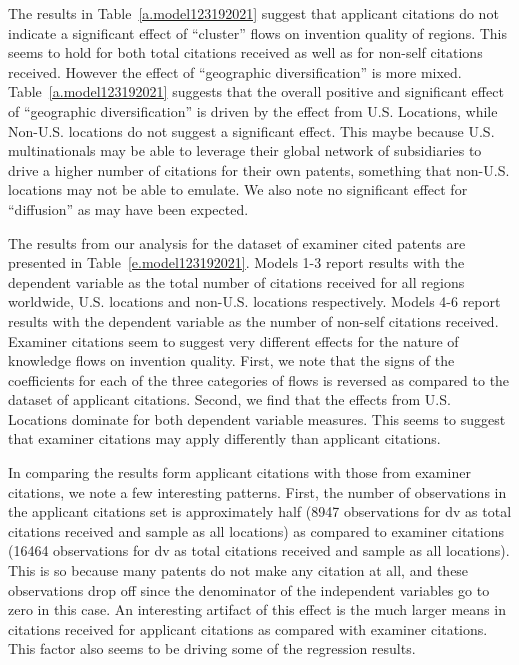 \documentclass[12pt,letterpaper]{article}
\begin{document}

The results in Table~\ref{a.model123192021} suggest that applicant citations do not indicate a significant effect of ``cluster'' flows on invention quality of regions. This seems to hold for both total citations received as well as for non-self citations received. However the effect of ``geographic diversification'' is more mixed. Table~\ref{a.model123192021} suggests that the overall positive and significant effect of ``geographic diversification'' is driven by the effect from U.S. Locations, while Non-U.S. locations do not suggest a significant effect. This maybe because U.S. multinationals may be able to leverage their global network of subsidiaries to drive a higher number of citations for their own patents, something that non-U.S. locations may not be able to emulate. We also note no significant effect for ``diffusion'' as may have been expected.



The results from our analysis for the dataset of examiner cited patents are presented in Table~\ref{e.model123192021}. Models 1-3 report results with the dependent variable as the total number of citations received for all regions worldwide, U.S. locations and non-U.S. locations respectively. Models 4-6 report results with the dependent variable as the number of non-self citations received. Examiner citations seem to suggest very different effects for the nature of knowledge flows on invention quality. First, we note that the signs of the coefficients for each of the three categories of flows is reversed as compared to the dataset of applicant citations. Second, we find that the effects from U.S. Locations dominate for both dependent variable measures. This seems to suggest that examiner citations may apply differently than applicant citations.



In comparing the results form applicant citations with those from examiner citations, we note a few interesting patterns. First, the number of observations in the applicant citations set is approximately half (8947 observations for dv as total citations received and sample as all locations) as compared to examiner citations (16464 observations for dv as total citations received and sample as all locations). This is so because many patents do not make any citation at all, and these observations drop off since the denominator of the independent variables go to zero in this case. An interesting artifact of this effect is the much larger means in citations received for applicant citations as compared with examiner citations. This factor also seems to be driving some of the regression results.\par
\end{document}
